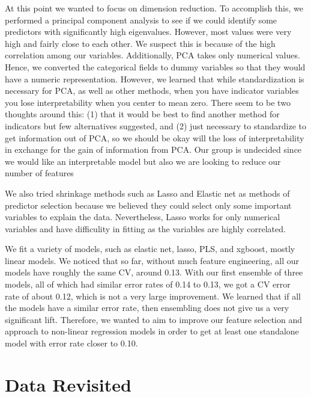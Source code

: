 \documentclass[12pt]{article}
\newcommand{\thanh}[1]{{\color{blue} [Thanh: #1]}}
\begin{document}
At this point we wanted to focus on dimension reduction. To accomplish this, we performed a principal component analysis to see if we could identify some predictors with significantly high eigenvalues. However, most values were very high and fairly close to each other. We suspect this is because of the high correlation among our variables.  Additionally, PCA takes only numerical values. %
Hence, we converted the categorical fields to dummy variables so that they would have a numeric representation. However, we learned that while standardization is necessary for PCA, as well as other methods, when you have indicator variables you lose interpretability when you center to mean zero.  There seem to be two thoughts around this: (1) that it would be best to find another method for indicators but few alternatives suggested, and (2) just necessary to standardize to get information out of PCA, so we should be okay will the loss of interpretability in exchange for the gain of information from PCA.  Our group is undecided since we would like an interpretable model but also we are looking to reduce our number of features

We also tried shrinkage methods such as Lasso and Elastic net as methods of predictor selection because we believed they could select only some important variables to explain the data. Nevertheless, Lasso works for only numerical variables %
and have difficulity in fitting as the variables are highly correlated.

We fit a variety of models, such as elastic net, lasso, PLS, and xgboost, mostly linear models.  We noticed that so far, without much feature engineering, all our models have roughly the same CV, around 0.13.  With our first ensemble of three models, all of which had similar error rates of 0.14 to 0.13, we got a CV error rate of about 0.12, which is not a very large improvement. We learned that if all the models have a similar error rate, then ensembling does not give us a very significant lift. Therefore, we wanted to aim to improve our feature selection and approach to non-linear regression models in order to get at least one standalone model with error rate closer to 0.10.

\section{Data Revisited}
\end{document}

